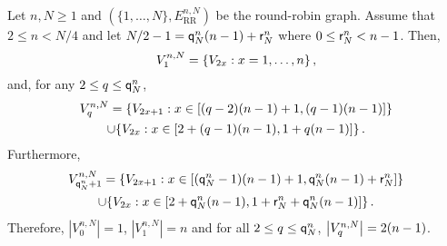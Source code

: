 \begin{lemma}\label{lem:ElementsAtDistanceq} 
Let $n,N\ge1$ and $(\{1,\ldots,N\},E^{n,N}_{\text{RR}})$ be the round-robin graph. Assume that $2\le n<N/4$ and let $N/2-1= {\mathsf{q}}^{n}_{N}(n-1)+{\mathsf{r}}^{n}_{N}$ where $0\le {\mathsf{r}}^{n}_{N}<n-1$. Then, 
\begin{equation}\label{def:V1}
V_{1}^{n,N}=\{V_{2x} : x=1,\ldots,n\}\,, 
\end{equation}
and, for any $2\le q \le {\mathsf{q}}^{n}_{N}$, 
\begin{multline}\label{def:Vq}
V_{q}^{n,N}=\{V_{2x+1} : x\in[(q-2)(n-1)+1,(q-1)(n-1)]\}\\
\cup\{V_{2x} : x\in[2+(q-1)(n-1),1+q(n-1)]\}\,.
\end{multline}
Furthermore,
\begin{multline}\label{def:Vq01'}
V_{{\mathsf{q}}^{n}_{N}+1}^{n,N}=\{V_{2x+1} : x\in[({\mathsf{q}}^{n}_{N}-1)(n-1)+1,{\mathsf{q}}^{n}_{N}(n-1)+{\mathsf{r}}^{n}_{N}]\}\\
\cup\{V_{2x} : x\in[2+{\mathsf{q}}^{n}_{N}(n-1),1+{\mathsf{r}}^{n}_{N}+{\mathsf{q}}^{n}_{N}(n-1)]\}\,.
\end{multline}
Therefore, $|V_{0}^{n,N}|=1$, $|V_{1}^{n,N}|=n$ and for all $2\le q\le{\mathsf{q}}^{n}_{N}$, $\left|V_{q}^{n,N}\right|=2(n-1)$.
\end{lemma}
